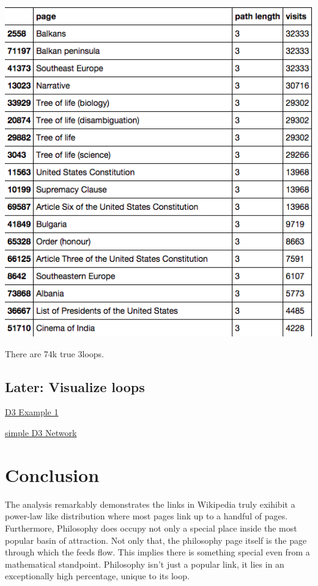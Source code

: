 \documentclass[twoside]{article}
\newcommand{\gray}[1]{{\leavevmode\color[gray]{0.5}{#1}}} %
\begin{document}
\begin{multicols}{2}
\includegraphics[scale=0.4]{graphics/top_3loops.png}


There are 74k true 3loops.

\subsection{Later: Visualize loops}

\href{http://projects.flowingdata.com/tut/interactive_network_demo/ }{D3 Example 1}

\href{http://christophergandrud.github.io/d3Network/}{simple D3 Network}

\section{Conclusion}

\gray{Next: word stem to see how broader ideas are related (taxonomy of ideas).
    * Broader: what if we consider all links (or first par)? other languages? 
        * popular page by links to it. }

\gray{* Is the network stable over time? 
        * analyze a few newer datasets. }

The analysis remarkably demonstrates the links in Wikipedia truly exihibit a power-law like distribution where most pages link up to a handful of pages. Furthermore, Philosophy does occupy not only a special place inside the most popular basin of attraction. Not only that, the philosophy page itself is the page through which the feeds flow. This implies there is something special even from a mathematical standpoint. Philosophy isn't just a popular link, it lies in an exceptionally high percentage, unique to its loop.


\end{multicols}
\end{document}
